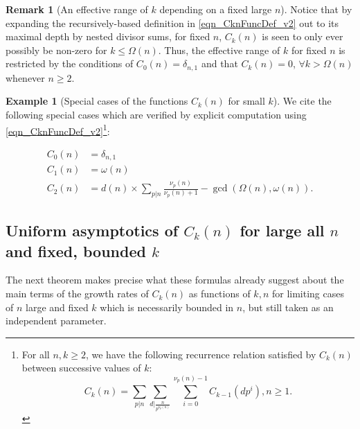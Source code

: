 \documentclass[11pt,reqno,a4letter]{article}
\numberwithin{figure}{section}
\numberwithin{table}{section}
\theoremstyle{plain}
\numberwithin{theorem}{section}
\theoremstyle{definition}
\newtheorem{example}[theorem]{Example}
\newtheorem{remark}[theorem]{Remark}
\newcommand{\NBRef}[1]{}
\begin{document}
\begin{remark}[An effective range of $k$ depending on a fixed large $n$]
Notice that by expanding the recursively-based definition in \eqref{eqn_CknFuncDef_v2} 
out to its maximal depth by nested divisor sums, for fixed $n$, $C_k(n)$ is seen to 
only ever possibly be non-zero for $k \leq \Omega(n)$. 
Thus, the effective range of $k$ for fixed $n$ is restricted by the 
conditions of $C_0(n) = \delta_{n,1}$ and that $C_k(n) = 0$, $\forall k > \Omega(n)$ 
whenever $n \geq 2$. 
\end{remark} 

\begin{example}[Special cases of the functions $C_k(n)$ for small $k$] 
\label{example_SpCase_Ckn} 
We cite the following special cases which are verified by 
explicit computation using \eqref{eqn_CknFuncDef_v2}\footnote{ 
     For all $n,k \geq 2$, we have the following recurrence 
     relation satisfied by $C_k(n)$ between successive values of $k$: 
     \begin{equation*}
     C_k(n) = \sum_{p|n} \sum_{d\rvert\frac{n}{p^{\nu_p(n)}}} \sum_{i=0}^{\nu_p(n)-1} 
          C_{k-1}\left(dp^i\right), n \geq 1. 
     \end{equation*}
}: 
\NBRef{A07-2020-04-26} 
\begin{align*} 
C_0(n) & = \delta_{n,1} \\ 
C_1(n) & = \omega(n) \\ 
C_2(n) & = d(n) \times \sum_{p|n} \frac{\nu_p(n)}{\nu_p(n)+1} - \gcd\left(\Omega(n), \omega(n)\right). 
\end{align*} 
\end{example} 

\subsection{Uniform asymptotics of $C_k(n)$ for large all $n$ and fixed, bounded $k$} 

The next theorem makes precise what these formulas already 
suggest about the main terms of the growth rates of 
$C_k(n)$ as functions of $k,n$ for limiting cases of $n$ large and fixed $k$ which is 
necessarily bounded in $n$, but still taken as an independent parameter. 
\end{document}
